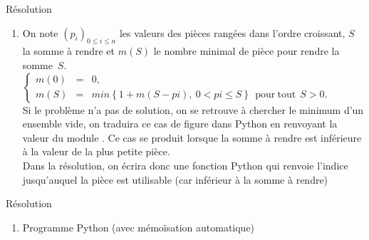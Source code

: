 \documentclass[10pt]{beamer}
\begin{document}
\begin{frame}{\Ctitle}{\stitle}
	\begin{exampleblock}{Résolution}
		\begin{enumerate}
			\item<1-> \textcolor{OliveGreen}{On note $(p_i)_{0 \leq i \leq n}$ les valeurs des pièces rangées dans l'ordre croissant, $S$ la somme à rendre et $m(S)$ le nombre minimal de pièce pour rendre la somme~$S$. \\}
			\onslide<2->\textcolor{OliveGreen}{$\left\{ \begin{array}{lll}
				m(0) & = & 0,                                                  \\
				m(S) & = & min\left\{ 1 + m(S-pi),\ 0 < pi \leq S \right\} \mathrm{\ \ pour\ tout\ \ } S > 0.\end{array} \right.$}\medskip \\
			\onslide<3->\textcolor{BrickRed}{\small \danger \;}\textcolor{OliveGreen}{Si le problème n'a pas de solution, on se retrouve à chercher le minimum d'un ensemble vide, on traduira ce cas de figure dans Python en renvoyant la valeur  du module . Ce cas se produit lorsque la somme à rendre est inférieure à la valeur de la plus petite pièce.\\}
			\onslide<4->\textcolor{OliveGreen}{Dans la résolution, on écrira donc une fonction Python  qui renvoie l'indice jusqu'auquel la pièce est utilisable (car inférieur à la somme à rendre)}
		\end{enumerate}
	\end{exampleblock}
\end{frame}

\begin{frame}{\Ctitle}{\stitle}
	\begin{exampleblock}{Résolution}
		\begin{enumerate}
			\addtocounter{enumi}{1}
			\item Programme Python (avec mémoïsation automatique)
			{}
		\end{enumerate}
	\end{exampleblock}
\end{frame}
\end{document}
